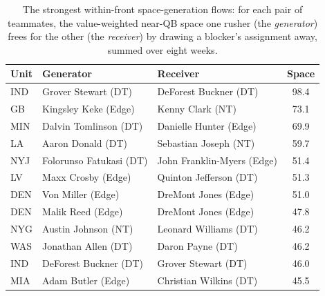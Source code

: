 \begin{table}[h!]
\centering
\footnotesize
\begin{tabular}{lllc}
\toprule
Unit & Generator & Receiver & Space \\
\midrule
IND & Grover Stewart (DT) & DeForest Buckner (DT) & 98.4 \\
GB & Kingsley Keke (Edge) & Kenny Clark (NT) & 73.1 \\
MIN & Dalvin Tomlinson (DT) & Danielle Hunter (Edge) & 69.9 \\
LA & Aaron Donald (DT) & Sebastian Joseph (NT) & 59.7 \\
NYJ & Folorunso Fatukasi (DT) & John Franklin-Myers (Edge) & 51.4 \\
LV & Maxx Crosby (Edge) & Quinton Jefferson (DT) & 51.3 \\
DEN & Von Miller (Edge) & DreMont Jones (Edge) & 51.0 \\
DEN & Malik Reed (Edge) & DreMont Jones (Edge) & 47.8 \\
NYG & Austin Johnson (NT) & Leonard Williams (DT) & 46.2 \\
WAS & Jonathan Allen (DT) & Daron Payne (DT) & 46.2 \\
IND & DeForest Buckner (DT) & Grover Stewart (DT) & 46.0 \\
MIA & Adam Butler (Edge) & Christian Wilkins (DT) & 45.5 \\
\bottomrule
\end{tabular}
\caption{The strongest within-front space-generation flows: for each pair of teammates, the value-weighted near-QB space one rusher (the \emph{generator}) frees for the other (the \emph{receiver}) by drawing a blocker's assignment away, summed over eight weeks.}
\label{tab:pocket_pair_flow}
\end{table}
